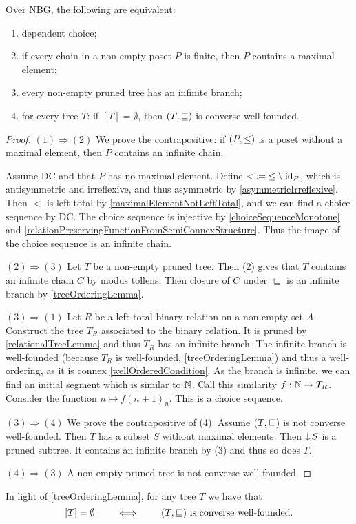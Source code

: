 \begin{proposition} \label{ZornEquivalentsDC}
Over NBG, the following are equivalent:
\begin{enumerate}
\item dependent choice;
\item if every chain in a non-empty poset $P$ is finite, then $P$ contains a maximal element;
\item every non-empty pruned tree has an infinite branch;
\item for every tree $T$: if $[T] = \emptyset$, then $\sSet{T,\sqsubseteq}$ is converse well-founded.
\end{enumerate}
\end{proposition}
\begin{proof}
$(1) \Rightarrow (2)$ We prove the contrapositive: if $\sSet{P, \leq}$ is a poset without a maximal element, then $P$ contains an infinite chain.

Assume DC and that $P$ has no maximal element. Define ${<} \coloneqq {\leq} \setminus\operatorname{id}_P$, which is antisymmetric and irreflexive, and thus asymmetric by \ref{asymmetricIrreflexive}. Then $<$ is left total by \ref{maximalElementNotLeftTotal}, and we can find a choice sequence by DC. The choice sequence is injective by \ref{choiceSequenceMonotone} and \ref{relationPreservingFunctionFromSemiConnexStructure}. Thus the image of the choice sequence is an infinite chain.

$(2) \Rightarrow (3)$ Let $T$ be a non-empty pruned tree. Then (2) gives that $T$ contains an infinite chain $C$ by modus tollens. Then closure of $C$ under $\sqsubseteq$ is an infinite branch by \ref{treeOrderingLemma}.

$(3) \Rightarrow (1)$ Let $R$ be a left-total binary relation on a non-empty set $A$. Construct the tree $T_R$ associated to the binary relation. It is pruned by \ref{relationalTreeLemma} and thus $T_R$ has an infinite branch. The infinite branch is well-founded (because $T_R$ is well-founded, \ref{treeOrderingLemma}) and thus a well-ordering, as it is connex \ref{wellOrderedCondition}. As the branch is infinite, we can find an initial segment which is similar to $\mathbb{N}$. Call this similarity $f: \mathbb{N} \to T_R$. Consider the function $n\mapsto f(n+1)_{n}$. This is a choice sequence.

$(3) \Rightarrow (4)$ We prove the contrapositive of (4). Assume $\sSet{T,\sqsubseteq}$ is not converse well-founded. Then $T$ has a subset $S$ without maximal elements. Then $\operatorname{\downarrow} S$ is a pruned subtree. It contains an infinite branch by (3) and thus so does $T$.

$(4) \Rightarrow (3)$ A non-empty pruned tree is not converse well-founded.
\end{proof}
In light of \ref{treeOrderingLemma}, for any tree $T$ we have that
\[ [T] = \emptyset \qquad\iff\qquad \text{$\sSet{T,\sqsubseteq}$ is converse well-founded.} \]

